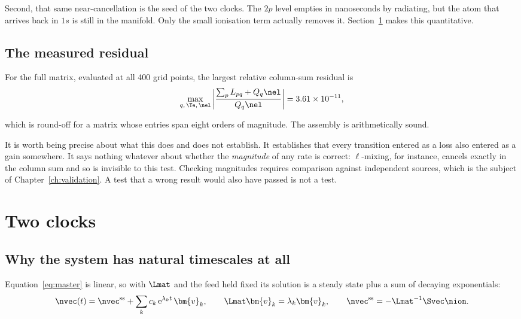 Second, that same near-cancellation is the seed of the two clocks. The $2p$
level empties in nanoseconds by radiating, but the atom that arrives back in
$1s$ is still in the manifold. Only the small ionisation term actually removes
it. Section~\ref{sec:two_clocks} makes this quantitative.

\subsection{The measured residual}

For the full matrix, evaluated at all 400 grid points, the largest relative
column-sum residual is
\begin{equation}
  \max_{q,\,\Te,\,\nel}
  \left|\frac{\sum_p L_{pq} + Q_q\nel}{Q_q\nel}\right|
  = 3.61\times10^{-11},
  \label{eq:conservation_measured}
\end{equation}

\noindent which is round-off for a matrix whose entries span eight orders of
magnitude. The assembly is arithmetically sound.

It is worth being precise about what this does and does not establish. It
establishes that every transition entered as a loss also entered as a gain
somewhere. It says nothing whatever about whether the \emph{magnitude} of any
rate is correct: $\ell$-mixing, for instance, cancels exactly in the column sum
and so is invisible to this test. Checking magnitudes requires comparison
against independent sources, which is the subject of
Chapter~\ref{ch:validation}. A test that a wrong result would also have passed
is not a test.

\section{Two clocks}
\label{sec:two_clocks}

\subsection{Why the system has natural timescales at all}

Equation~\eqref{eq:master} is linear, so with $\Lmat$ and the feed held fixed its
solution is a steady state plus a sum of decaying exponentials:
\begin{equation}
  \nvec(t) = \nvec^{\mathrm{ss}}
           + \sum_{k} c_k\,\mathrm{e}^{\lambda_k t}\,\bm{v}_k,
  \qquad
  \Lmat\bm{v}_k = \lambda_k\bm{v}_k,
  \qquad
  \nvec^{\mathrm{ss}} = -\Lmat^{-1}\Svec\nion.
  \label{eq:eigen_solution}
\end{equation}

